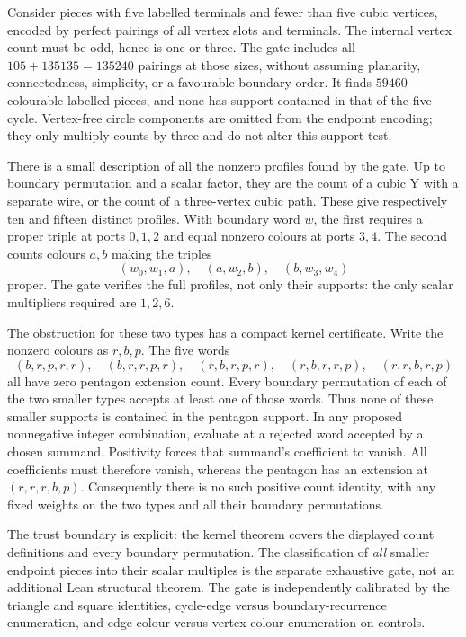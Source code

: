 Consider pieces with five labelled terminals and fewer than five cubic
vertices, encoded by perfect pairings of all vertex slots and terminals.
The internal vertex count must be odd, hence is one or three. The gate
includes all $105+135135=135240$ pairings at those sizes, without assuming
planarity, connectedness, simplicity, or a favourable boundary order. It
finds $59460$ colourable labelled pieces, and none has support contained
in that of the five-cycle. Vertex-free circle components are omitted from
the endpoint encoding; they only multiply counts by three and do not
alter this support test.

There is a small description of all the nonzero profiles found by the
gate. Up to boundary permutation and a scalar factor, they are the count
of a cubic Y with a separate wire, or the count of a three-vertex cubic
path. These give respectively ten and fifteen distinct profiles. With
boundary word $w$, the first requires a proper triple at ports $0,1,2$
and equal nonzero colours at ports $3,4$. The second counts colours $a,b$
making the triples
\[
       (w_0,w_1,a),\quad(a,w_2,b),\quad(b,w_3,w_4)
\]
proper. The gate verifies the full profiles, not only their supports:
the only scalar multipliers required are $1,2,6$.

The obstruction for these two types has a compact kernel certificate.
Write the nonzero colours as $r,b,p$. The five words
\[
 (b,r,p,r,r),\quad(b,r,r,p,r),\quad(r,b,r,p,r),\quad
 (r,b,r,r,p),\quad(r,r,b,r,p)
\]
all have zero pentagon extension count.
Every boundary permutation of each of the two smaller types accepts at
least one of those words.
Thus none of these smaller supports is contained in the pentagon support.
In any proposed nonnegative integer combination, evaluate at a rejected
word accepted by a chosen summand. Positivity forces that summand's
coefficient to vanish. All coefficients must therefore vanish, whereas
the pentagon has an extension at $(r,r,r,b,p)$. Consequently there is no
such positive count identity, with any fixed weights on the two types
and all their boundary permutations.

The trust boundary is explicit: the kernel theorem covers the displayed
count definitions and every boundary permutation. The classification of
\emph{all} smaller endpoint pieces into their scalar multiples is the
separate exhaustive gate, not an additional Lean structural theorem. The
gate is independently calibrated by the triangle and square identities,
cycle-edge versus boundary-recurrence enumeration, and edge-colour versus
vertex-colour enumeration on controls.

